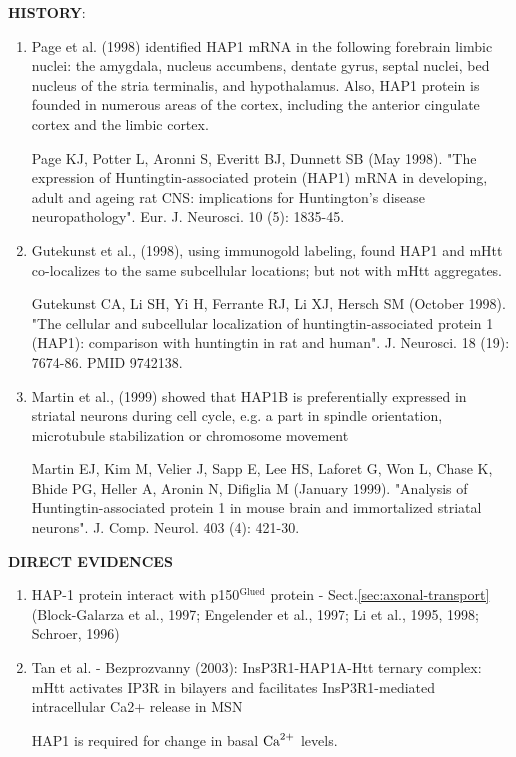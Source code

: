 {\bf HISTORY}:
\begin{enumerate}

  \item Page et al. (1998) identified HAP1 mRNA in the following forebrain
  limbic nuclei: the amygdala, nucleus accumbens, dentate gyrus, septal nuclei,
  bed nucleus of the stria terminalis, and hypothalamus. Also, HAP1 protein is
  founded in numerous areas of the cortex, including the anterior cingulate
  cortex and the limbic cortex.
  
  Page KJ, Potter L, Aronni S, Everitt BJ, Dunnett SB (May 1998). "The
  expression of Huntingtin-associated protein (HAP1) mRNA in developing,
  adult and ageing rat CNS: implications for Huntington's disease
  neuropathology". Eur. J. Neurosci. 10 (5): 1835-45.    

  
  \item Gutekunst et al., (1998), using immunogold labeling, found HAP1 and mHtt
  co-localizes to the same subcellular locations; but not with mHtt aggregates.
  
  Gutekunst CA, Li SH, Yi H, Ferrante RJ, Li XJ, Hersch SM (October 1998). "The
  cellular and subcellular localization of huntingtin-associated protein 1
  (HAP1): comparison with huntingtin in rat and human". J. Neurosci. 18 (19):
  7674-86. PMID 9742138.  


  \item Martin et al., (1999) showed that HAP1B is preferentially expressed in
  striatal neurons during cell cycle, e.g. a part in spindle orientation,
  microtubule stabilization or chromosome movement
  
  
  Martin EJ, Kim M, Velier J, Sapp E, Lee HS, Laforet G, Won L, Chase K,
  Bhide PG, Heller A, Aronin N, Difiglia M (January 1999). "Analysis of
  Huntingtin-associated protein 1 in mouse brain and immortalized striatal
  neurons". J. Comp. Neurol. 403 (4): 421-30.
\end{enumerate}


{\bf DIRECT EVIDENCES}
\begin{enumerate}
  
  \item HAP-1 protein interact with p150$^\text{Glued}$ protein -
  Sect.\ref{sec:axonal-transport} (Block-Galarza et al., 1997; Engelender et
  al., 1997; Li et al., 1995, 1998; Schroer, 1996)
  
  

  \item Tan et al. - Bezprozvanny (2003): InsP3R1-HAP1A-Htt ternary complex:
  mHtt activates IP3R in bilayers and facilitates InsP3R1-mediated intracellular
  Ca2+ release in MSN

HAP1 is required for change in basal ${\text{Ca}^{2+}}$ levels. 

\end{enumerate}

